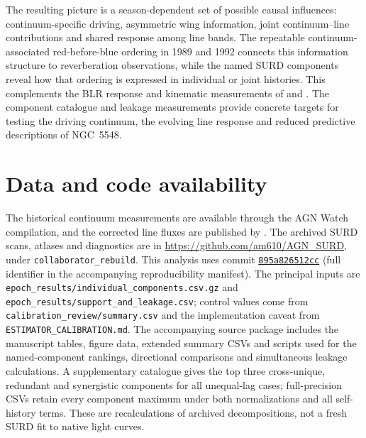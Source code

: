 \documentclass[fleqn,usenatbib]{mnras}
\begin{document}
The resulting picture is a season-dependent set of possible causal influences: continuum-specific driving, asymmetric wing information, joint continuum--line contributions and shared response among line bands. The repeatable continuum-associated red-before-blue ordering in 1989 and 1992 connects this information structure to reverberation observations, while the named SURD components reveal how that ordering is expressed in individual or joint histories. This complements the BLR response and kinematic measurements of \citet{Lu2022} and \citet{Xi2025}. The component catalogue and leakage measurements provide concrete targets for testing the driving continuum, the evolving line response and reduced predictive descriptions of NGC~5548.

\section*{Data and code availability}
The historical continuum measurements are available through the AGN Watch compilation, and the corrected line fluxes are published by \citet{WandersPeterson1996}. The archived SURD scans, atlases and diagnostics are in \url{https://github.com/am610/AGN_SURD}, under \texttt{collaborator\_rebuild}. This analysis uses commit \href{https://github.com/am610/AGN_SURD/tree/895a826512cc2f866035cc5b7b4430e35f28ab44}{\texttt{895a826512cc}} (full identifier in the accompanying reproducibility manifest). The principal inputs are \texttt{epoch\_results/individual\_components.csv.gz} and \texttt{epoch\_results/support\_and\_leakage.csv}; control values come from \texttt{calibration\_review/summary.csv} and the implementation caveat from \texttt{ESTIMATOR\_CALIBRATION.md}. The accompanying source package includes the manuscript tables, figure data, extended summary CSVs and scripts used for the named-component rankings, directional comparisons and simultaneous leakage calculations. A supplementary catalogue gives the top three cross-unique, redundant and synergistic components for all unequal-lag cases; full-precision CSVs retain every component maximum under both normalizations and all self-history terms. These are recalculations of archived decompositions, not a fresh SURD fit to native light curves.





\clearpage
\onecolumn
\appendix
\end{document}
